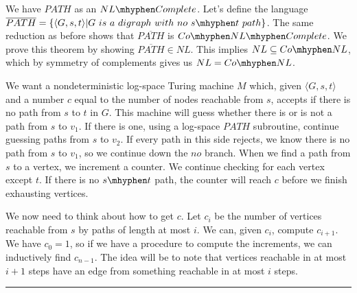 \documentclass[twoside]{article}
\newenvironment{proof}{{\bf Proof:}}{\hfill\rule{2mm}{2mm}}
\begin{document}
\begin{proof}
	
	We have $PATH$ as an $NL\mhyphen Complete$.  Let's define the language $\overline{PATH} = \{ \langle G,s,t\rangle | G \ is \ a \ digraph \ with \ no \ s\mhyphen t \ path    \}$.  The same reduction as before shows that $\overline{PATH}$ is $Co\mhyphen NL\mhyphen Complete$.  We prove this theorem by showing $\overline{PATH}\in NL$.  This implies $NL\subseteq Co\mhyphen NL$, which by symmetry of complements gives us $NL = Co\mhyphen NL$.
	
	We want a nondeterministic log-space Turing machine $M$ which, given $\langle G,s,t \rangle$ and a number $c$ equal to the number of nodes reachable from $s$, accepts if there is no path from $s$ to $t$ in $G$.  This machine will guess whether there is or is not a path from $s$ to $v_1$.  If there is one, using a log-space $PATH$ subroutine, continue guessing paths from $s$ to $v_2$.  If every path in this side rejects, we know there is no path from $s$ to $v_1$, so we continue down the $no$ branch.  When we find a path from $s$ to a vertex, we increment a counter.  We continue checking for each vertex except $t$. If there is no $s\mhyphen t$ path, the counter will reach $c$ before we finish exhausting vertices.
	
	We now need to think about how to get $c$.  Let $c_i$ be the number of vertices reachable from $s$ by paths of length at most $i$.  We can, given $c_i$, compute $c_{i+1}$.  We have $c_0=1$, so if we have a procedure to compute the increments, we can inductively find $c_{n-1}$.  The idea will be to note that vertices reachable in at most $i+1$ steps have an edge from something reachable in at most $i$ steps.  
	
	
	
\end{proof}
\end{document}
